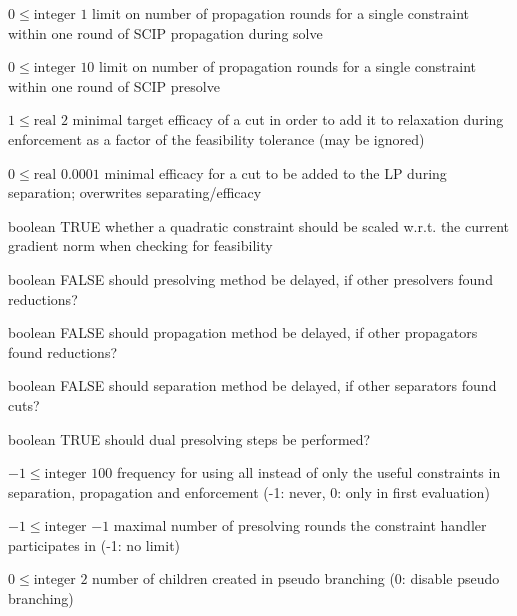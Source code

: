 %
{$0\leq\textrm{integer}$}%
{$1$}%
{limit on number of propagation rounds for a single constraint within one round of SCIP propagation during solve}%
{}

%
{$0\leq\textrm{integer}$}%
{$10$}%
{limit on number of propagation rounds for a single constraint within one round of SCIP presolve}%
{}

%
{$1\leq\textrm{real}$}%
{$2$}%
{minimal target efficacy of a cut in order to add it to relaxation during enforcement as a factor of the feasibility tolerance (may be ignored)}%
{}

%
{$0\leq\textrm{real}$}%
{$0.0001$}%
{minimal efficacy for a cut to be added to the LP during separation; overwrites separating/efficacy}%
{}

%
{boolean}%
{TRUE}%
{whether a quadratic constraint should be scaled w.r.t. the current gradient norm when checking for feasibility}%
{}

%
{boolean}%
{FALSE}%
{should presolving method be delayed, if other presolvers found reductions?}%
{}

%
{boolean}%
{FALSE}%
{should propagation method be delayed, if other propagators found reductions?}%
{}

%
{boolean}%
{FALSE}%
{should separation method be delayed, if other separators found cuts?}%
{}

%
{boolean}%
{TRUE}%
{should dual presolving steps be performed?}%
{}

%
{$-1\leq\textrm{integer}$}%
{$100$}%
{frequency for using all instead of only the useful constraints in separation, propagation and enforcement (-1: never, 0: only in first evaluation)}%
{}

%
{$-1\leq\textrm{integer}$}%
{$-1$}%
{maximal number of presolving rounds the constraint handler participates in (-1: no limit)}%
{}

%
{$0\leq\textrm{integer}$}%
{$2$}%
{number of children created in pseudo branching (0: disable pseudo branching)}%
{}

